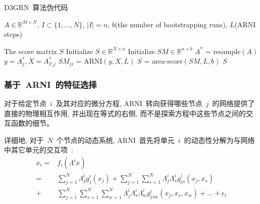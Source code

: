 \begin{algorithm}
  \caption{D3GRN~算法伪代码}
  \label{alg:D3GRN}
  \begin{algorithmic}[1]
  \Require  $A \in \mathbb{R}^{M \times N}$, $I \subset \{1,\ldots,N\}$, 
            $|I| = n$,
            $b$(the number of bootstrapping runs), $L$(ARNI steps) %
  
  \Ensure The score matrix $S$ 
  \State Initialize $S \in \mathbb{R}^{N \times n}$     
  \State Initialize $SM \in \mathbb{R}^{n \times b}$     
                                     
        \State $A^{*}$ = resample$(A)$                  
                                              
        \State $y = A^{*}_j, X = A^{*}_{I\setminus j}$
        \State $SM_{ji}$ = ARNI$(y,X,L)$                    
        \EndFor
  \EndFor           
  \State $S$ = area-score$(SM,L,b)$                      
  \State \Return $S$                                    
\end{algorithmic}
\end{algorithm}

\subsubsection{基于~ARNI~的特征选择}

对于给定节点~$i$~及其对应的微分方程, 
ARNI~转向获得哪些节点~$j$~的网络提供了直接的物理相互作用, 并出现在等式的右侧, 
而不是探索方程中这些节点之间的交互函数的细节。

详细地, 对于~$N$~个节点的动态系统, 
ARNI~首先将单元~$i$~的动态性分解为与网络中其它单元的交互项~\cite{casadiego2017model}:
\begin{equation}
\label{eq:xi}
\begin{split}
\dot{x_i}= & f_i(\Lambda ^i x)\\
         = &\sum_{j=1}^{N} \Lambda^i_{j} g^i_j(x_j) + 
                             \sum_{j=1}^{N} \sum_{s=1}^{N}\Lambda^i_{j}\Lambda^i_{s}g^i_{js}(x_j,x_s)\\
         + &\sum_{j=1}^{N} \sum_{s=1}^{N} \sum_{w=1}^{N}\Lambda^i_{j}\Lambda^i_{s}\Lambda^i_{w}g^i_{jsw}(x_j,x_s,x_w)+ \ldots + \epsilon_{i}
\end{split}
\end{equation}

